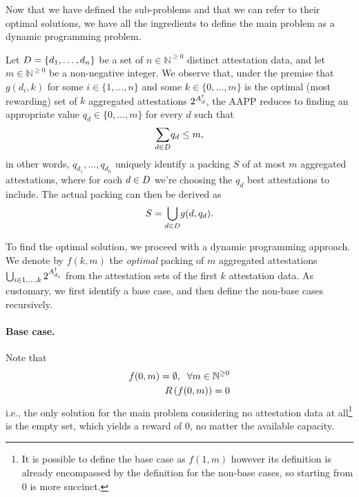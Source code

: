 \documentclass{article}
\begin{document}
Now that we have defined the sub-problems and that we can refer to their
optimal solutions, we have all the ingredients to define the main problem as a
dynamic programming problem.

Let $D = \{ d_1, \dots, d_n \}$ be a set of $n \in \mathbb{N}^{\geq 0}$
distinct attestation data, and let $m \in \mathbb{N}^{\geq 0}$ be a
non-negative integer. We observe that, under the premise that $g(d_i, k)$ for
some $i \in \{1, \dots, n \}$ and some $k \in \{ 0, \dots, m \}$ is the optimal
(most rewarding) set of $k$ aggregated attestations
$2^{A_{d}^{\dagger}}$, the AAPP reduces to finding an appropriate
value $q_d \in \{ 0, \dots, m \}$ for every $d$ such that
%
\begin{equation}
  \underset{d \in D}{\sum} q_d \leq m, \label{eq:capm}
\end{equation}
%
in other words, $q_{d_1}, \dots, q_{d_n}$ uniquely identify a packing $S$ of at
most $m$ aggregated attestations, where for each $d \in D$ we're choosing
the $q_d$ best attestations to include. The actual packing can then be derived
as
%
\begin{equation}
   S = \underset{d \in D}{\bigcup} g(d, q_d).
\end{equation}

To find the optimal solution, we proceed with a dynamic programming approach.
We denote by $f(k, m)$ the \emph{optimal} packing of $m$ aggregated
attestations $\bigcup_{i \in 1, \dots, k} 2^{A_{d_i}^{\dagger}}$
from the attestation sets of the first $k$ attestation data.  As customary, we
first identify a base case, and then define the non-base cases recursively.

\paragraph{Base case.}
% 
Note that
%
\begin{align}
  f(0, m) = \emptyset, \;\; \forall m \in \mathbb{N}^{\geq 0}\\
  R\left(f(0,m)\right) = 0
\end{align}
%
i.e., the only solution for the main problem considering no attestation data at
all\footnote{It is possible to define the base case as $f(1, m)$ however its
definition is already encompassed by the definition for the non-base cases, so
starting from 0 is more succinct.} is the empty set, which yields a reward of
0, no matter the available capacity. 
\end{document}
